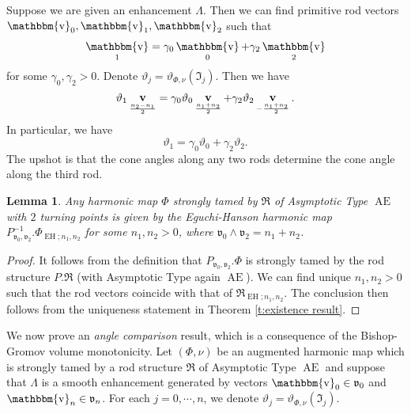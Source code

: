 \documentclass[a4paper,11pt]{amsart}
\newtheorem{lemma}[theorem]{Lemma}
\theoremstyle{definition}
\numberwithin{equation}{section}
\newcommand{\mv} {\mathfrak v}
\newcommand{\mI} {\mathfrak I}
\newcommand{\mR} {\mathfrak R}
\DeclareMathOperator{\bbv}{\mathbbm{v}}
\DeclareMathOperator{\bv}{{\bf v}}
\DeclareMathOperator{\Ae}{AE}
\DeclareMathOperator{\EH}{EH}
\begin{document}
 
Suppose we are given an enhancement $\Lambda$. Then we can find primitive rod vectors $\bbv_0, \bbv_1, \bbv_2$ such that 
$$\bbv_1=\gamma_0\bbv_0+\gamma_2\bbv_2$$
for some $\gamma_0, \gamma_2>0$. 
Denote $\vartheta_j=\vartheta_{\Phi, \nu}(\mI_j)$. Then we have 
$$\vartheta_1\bv_{\frac{n_2-n_1}{2}}=\gamma_0 \vartheta_0\bv_{\frac{n_1+n_2}{2}}+\gamma_2\vartheta_2\bv_{-\frac{n_1+n_2}{2}}.$$
 In particular, we have 
 \begin{equation}\label{e:angle equality}\vartheta_1=\gamma_0\vartheta_0+\gamma_2\vartheta_2.
 \end{equation}
 The upshot is that the cone angles along any two rods determine the cone angle along the third rod. 

\begin{lemma}\label{lem:uniquness of EH}
    Any harmonic map $\Phi$ strongly tamed by $\mR$ of  Asymptotic Type  $\Ae$ with $2$ turning points is given by the Eguchi-Hanson harmonic map $P_{\mv_0,\mv_2}^{-1}.\Phi_{\EH; n_1, n_2}$ for some $n_1, n_2>0$, where $\mv_0\wedge\mv_2=n_1+n_2$.
\end{lemma}
\begin{proof} 
It follows from the definition that $P_{\mv_0,\mv_2}.\Phi$ is strongly tamed by the rod structure $P. \mR$ (with Asymptotic Type again $\Ae$).  We can find unique $n_1, n_2>0$ such that the rod vectors coincide with that of $\mR_{\EH; n_1, n_2}$. 
The conclusion then follows from the uniqueness statement in Theorem \ref{t:existence result}. 
\end{proof}







We now prove  an \emph{angle comparison} result, which is a consequence of the Bishop-Gromov volume monotonicity. Let $(\Phi, \nu)$ be an augmented harmonic map which is strongly tamed by a rod structure $\mR$ of  Asymptotic Type  $\Ae$ and suppose that  $\Lambda$ is a smooth enhancement generated by vectors $\bbv_0\in \mv_0$ and $\bbv_n\in \mv_n$. For each $j=0, \cdots, n$, we denote $\vartheta_j=\vartheta_{\Phi, \nu}(\mI_j)$.
\end{document}
